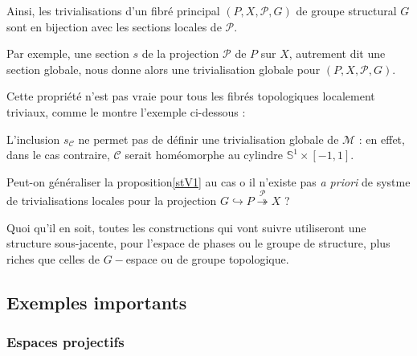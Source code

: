 Ainsi, les trivialisations d'un fibr\'e principal $(P,X,\mathcal{P},G)$ de groupe structural $G$ sont en bijection avec les sections locales de $\mathcal{P}$.
\par
Par exemple, une section $s$ de la projection $\mathcal{P}$ de $P$ sur $X$, autrement dit une section globale, %
nous donne alors une trivialisation globale pour $(P,X,\mathcal{P},G)$.

\etoile
Cette propri\'et\'e n'est pas vraie pour tous les fibr\'es topologiques localement triviaux, comme le montre l'exemple ci-dessous :

\begin{exem}
L'inclusion $s_\mathcal{C}$ ne permet pas de d\'efinir une trivialisation globale de $\mathcal{M}$ : %
en effet, dans le cas contraire, $\mathcal{C}$ serait hom\'eomorphe au cylindre $\mathbb{S}^1\times [-1,1]$.
\end{exem} %

\begin{rema}
Peut-on g\'en\'eraliser la proposition\ref{stV1} au cas o il n'existe pas \emph{a priori} de systme de trivialisations locales pour la projection %
$G\hookrightarrow P\overset{\mathcal{P}}{\twoheadrightarrow}X$ ?
\par
Quoi qu'il en soit, toutes les constructions qui vont suivre utiliseront une structure sous-jacente, pour l'espace de phases ou le groupe de structure, %
plus riches que celles de $G-$espace ou de groupe topologique.
\end{rema}








\subsection{Exemples importants}

\subsubsection{Espaces projectifs}

